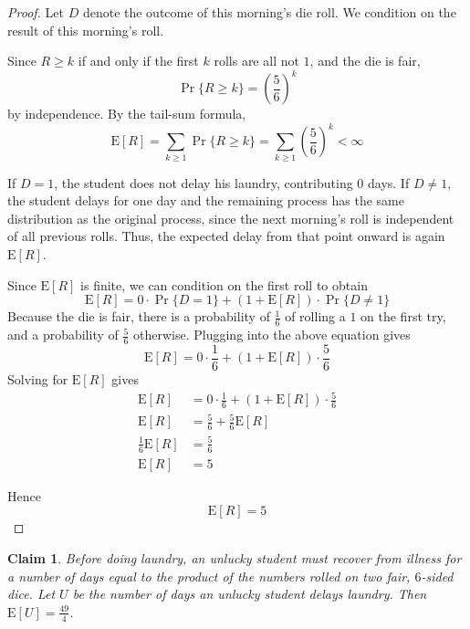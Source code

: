 \documentclass{article}
\newtheorem{claim}{Claim}
\begin{document}
\begin{proof}
    Let $D$ denote the outcome of this morning's die roll. We condition on the result of this 
    morning's roll. 

    \medskip

    Since $R \geq k$ if and only if the first $k$ rolls are all not $1$, and the die is fair,
    \[
    \Pr\{R \geq k\} = \left(\frac{5}{6}\right)^k
    \]
    by independence. By the tail-sum formula,
    \[
    \mathrm{E}[R] = \sum_{k\geq1}\Pr\{R \geq k\} = \sum_{k\geq1}\left(\frac{5}{6}\right)^k 
    < \infty
    \]

    \medskip
    
    If $D = 1$, the student does not delay his laundry, contributing $0$ days. 
    If $D \neq 1$, the student delays for one day and the remaining process has the same 
    distribution as the original process, since the next morning's roll is independent of all 
    previous rolls. Thus, the expected delay from that point onward is again $\mathrm{E}[R]$. 

    \medskip
    
    Since $\mathrm{E}[R]$ is finite, we can condition on the first roll to obtain
    \[
    \mathrm{E}[R] = 0 \cdot \Pr\{D = 1\} + (1 + \mathrm{E}[R]) \cdot \Pr\{D \neq 1\}
    \]
    Because the die is fair, there is a probability of $\frac{1}{6}$ of rolling a $1$ on the 
    first try, and a probability of $\frac{5}{6}$ otherwise. Plugging into the above equation 
    gives
    \[
    \mathrm{E}[R] = 0 \cdot \frac{1}{6} + (1 + \mathrm{E}[R]) \cdot \frac{5}{6}
    \]
    Solving for $\mathrm{E}[R]$ gives
    \[
    \begin{aligned}
    \mathrm{E}[R] &= 0 \cdot \frac{1}{6} + (1 + \mathrm{E}[R]) \cdot \frac{5}{6} \\
    \mathrm{E}[R] &= \frac{5}{6} + \frac{5}{6}\mathrm{E}[R] \\
    \frac{1}{6}\mathrm{E}[R] &= \frac{5}{6} \\
    \mathrm{E}[R] &= 5
    \end{aligned}
    \]

    \medskip

    Hence
    \[
    \mathrm{E}[R] = 5
    \]
\end{proof}

\begin{claim}
    Before doing laundry, an unlucky student must recover from illness for a number of days 
    equal to the product of the numbers rolled on two fair, $6$-sided dice. Let $U$ be the
    number of days an unlucky student delays laundry. Then $\mathrm{E}[U] = \frac{49}{4}$.
\end{claim}
\end{document}
